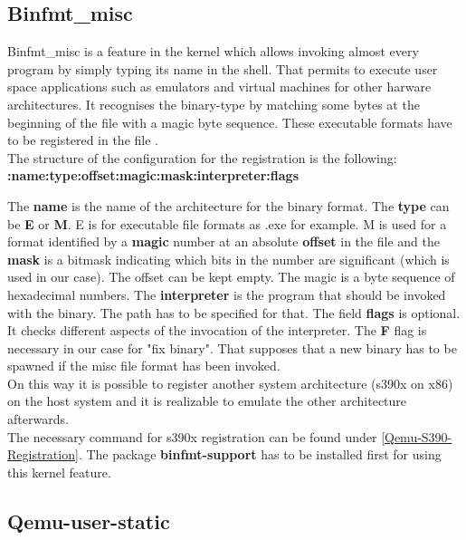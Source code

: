 \subsection{Binfmt\_misc}

Binfmt\_misc is a feature in the kernel which allows invoking almost every program by simply typing its name in the shell. That permits to execute user space applications such as emulators and virtual machines for other harware architectures. It recognises the binary-type by matching some bytes at the beginning of the file with a magic byte sequence. These executable formats have to be registered in the file .\\
The structure of the configuration for the registration is the following: \\ \textbf{:name:type:offset:magic:mask:interpreter:flags} 

The \textbf{name} is the name of the architecture for the binary format. The \textbf{type} can be \textbf{E} or \textbf{M}. E is for executable file formats as .exe for example. M is used for a format identified by a \textbf{magic} number at an absolute \textbf{offset} in the file and the \textbf{mask} is a bitmask indicating which bits in the number are significant\cite{Slackware2020} (which is used in our case). 
The offset can be kept empty. The magic is a byte sequence of hexadecimal numbers. The \textbf{interpreter} is the program that should be invoked with the binary\cite{Guenther2020}. 
The path has to be specified for that. The field \textbf{flags} is optional. It checks different aspects of the invocation of the interpreter. The \textbf{F} flag is necessary in our case for "fix binary". 
That supposes that a new binary has to be spawned if the misc file format has been invoked.\\
On this way it is possible to register another system architecture (s390x on x86) on the host system and it is realizable to emulate the other architecture afterwards. \\
The necessary command for s390x registration can be found under \ref{Qemu-S390-Registration}.
The package \textbf{binfmt-support} has to be installed first for using this kernel feature. 

\subsection{Qemu-user-static}

